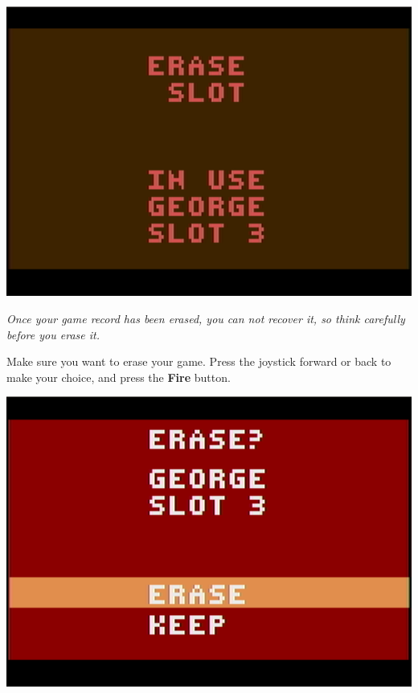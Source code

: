 \documentclass[10pt,twocolumn,openany,article]{memoir}
\begin{document}
\begin{center}
  \includegraphics[width=\columnwidth]{../Manual/EraseSlotNTSC.png}
\end{center}

\ifdefined\DEMO

\emph{Once your game record has been  erased, you can not recover it, so
  think carefully before you erase it.}

\else

Make sure  you want to  erase your game.  Press the joystick  forward or
back to make your choice, and press the \textbf{Fire} button.

\begin{center}
  \includegraphics[width=\columnwidth]{../Manual/ConfirmEraseNTSC.png}
\end{center}
\end{document}
